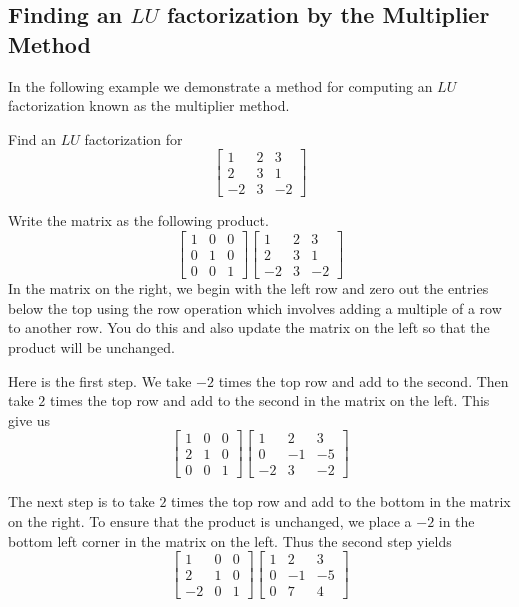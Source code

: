 \documentclass{ximera}
\begin{document}
\subsection*{Finding an $LU$ factorization by the Multiplier Method}

In the following example we demonstrate a method for computing an $LU$ factorization known as the multiplier method.

\begin{example}\label{ex:multiplierLU}
Find an $LU$ factorization for
\[
\begin{bmatrix}
1 & 2 & 3 \\
2 & 3 & 1 \\
-2 & 3 & -2
\end{bmatrix} 
\]

\begin{explanation}
Write the matrix as the following product.
\[
\begin{bmatrix}
1 & 0 & 0 \\
0 & 1 & 0 \\
0 & 0 & 1
\end{bmatrix} 
\begin{bmatrix}
1 & 2 & 3 \\
2 & 3 & 1 \\
-2 & 3 & -2
\end{bmatrix} 
\]
In the matrix on the right, we begin with the left row and zero
out the entries below the top using the row operation which involves adding a multiple of a row to another row. You do this and also update the matrix on the left so that the product will be unchanged. 

Here is the first step.  We take $-2$ times the top row and add to the second. Then take $2$ times the top row and add to the second in the matrix on the left.  This give us
\[
\begin{bmatrix}
1 & 0 & 0 \\
2 & 1 & 0 \\
0 & 0 & 1
\end{bmatrix} 
\begin{bmatrix}
1 & 2 & 3 \\
0 & -1 & -5 \\
-2 & 3 & -2
\end{bmatrix} 
\]

The next step is to take $2$ times the top row and add to the bottom in the matrix on the right. To ensure that the product is unchanged, we place a $-2$ in the bottom left corner in the matrix on the left. Thus the second step yields
\[
\begin{bmatrix}
1 & 0 & 0 \\
2 & 1 & 0 \\
-2 & 0 & 1
\end{bmatrix} 
\begin{bmatrix}
1 & 2 & 3 \\
0 & -1 & -5 \\
0 & 7 & 4
\end{bmatrix} 
\]


\end{explanation}
\end{example}
\end{document}
